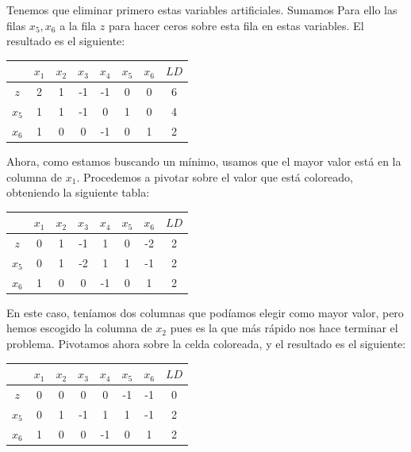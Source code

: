 \documentclass[11pt,table]{article}
\begin{document}
    Tenemos que eliminar primero estas variables artificiales. Sumamos Para ello las filas \(x_5,x_6\) a la fila \(z\) para hacer ceros sobre esta fila en estas variables. El resultado es el siguiente:

    \begin{table}[H]
        \centering
        \begin{tabular}{c|cccccc|c}
              & $x_1$ & $x_2$ & $x_3$ & $x_4$ & $x_5$ & $x_6$ & $LD$ \\ \hline
        $z$   &\cellcolor[HTML]{AED6F1} 2     & 1     & -1     & -1     & 0    & 0    & 6    \\
        $x_5$ & 1     & 1     & -1     & 0     & 1     & 0     & 4    \\
        $x_6$ & 1     & 0     & 0     & -1     & 0     & 1     & 2   
    \end{tabular}
    \end{table}

    Ahora, como estamos buscando un mínimo, usamos que el mayor valor está en la columna de \(x_1\). Procedemos a pivotar sobre el valor que está coloreado, obteniendo la siguiente tabla:

    \begin{table}[H]
        \centering
        \begin{tabular}{c|cccccc|c}
              & $x_1$ & $x_2$ & $x_3$ & $x_4$ & $x_5$ & $x_6$ & $LD$ \\ \hline
        $z$   & 0     & 1     & -1     & 1     & 0    & -2    & 2    \\
        $x_5$ & 0     & \cellcolor[HTML]{AED6F1}1     & -2     & 1     & 1     & -1     & 2    \\
        $x_6$ & 1     & 0     & 0     & -1     & 0     & 1     & 2   
    \end{tabular}
    \end{table}

    En este caso, teníamos dos columnas que podíamos elegir como mayor valor, pero hemos escogido la columna de \(x_2\) pues es la que más rápido nos hace terminar el problema. Pivotamos ahora sobre la celda coloreada, y el resultado es el siguiente:

    \begin{table}[H]
        \centering
        \begin{tabular}{c|cccccc|c}
              & $x_1$ & $x_2$ & $x_3$ & $x_4$ & $x_5$ & $x_6$ & $LD$ \\ \hline
        $z$   & 0     & 0     & 0     & 0     & -1    & -1    & 0    \\
        $x_5$ & 0     & 1     & -1     & 1     & 1     & -1     & 2    \\
        $x_6$ & 1     & 0     & 0     & -1     & 0     & 1     & 2   
    \end{tabular}
    \end{table}
    
\end{document}
